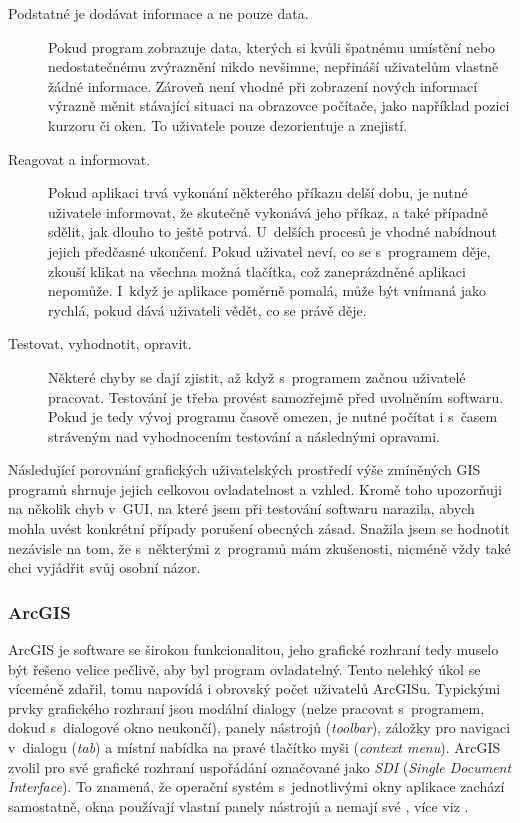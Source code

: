 \documentclass[a4paper,12pt,draft]{article}
\begin{document}
\begin{description}
\item [Podstatné je dodávat informace a ne pouze data.] Pokud program
zobrazuje data, kterých si kvůli špatnému umístění nebo nedostatečnému
zvýraznění nikdo nevšimne, nepřináší uživatelům vlastně žádné
informace. Zároveň není vhodné při zobrazení nových informací výrazně
měnit stávající situaci na obrazovce počítače, jako například pozici
kurzoru či oken. To uživatele pouze dezorientuje a znejistí.

\item [Reagovat a informovat.] Pokud aplikaci trvá vykonání některého příkazu
delší dobu, je nutné uživatele informovat, že skutečně vykonává
jeho příkaz, a také případně sdělit, jak dlouho to ještě potrvá.
U~delších procesů je vhodné nabídnout jejich předčasné ukončení. Pokud
uživatel neví, co se s~programem děje, zkouší klikat na všechna možná
tlačítka, což zaneprázdněné aplikaci nepomůže. I~když je aplikace
poměrně pomalá, může být vnímaná jako rychlá, pokud dává uživateli
vědět, co se právě děje.

\item [Testovat, vyhodnotit, opravit.] Některé chyby se dají zjistit,
až když s~programem začnou uživatelé pracovat. Testování je třeba
provést samozřejmě před uvolněním softwaru. Pokud je tedy vývoj
programu časově omezen, je nutné počítat i s~časem stráveným nad
vyhodnocením testování a následnými opravami.
 \end{description}

Následující porovnání grafických uživatelských prostředí
výše zmíněných GIS programů shrnuje jejich celkovou ovladatelnost a
vzhled. Kromě toho upozorňuji na několik chyb v~GUI, na které jsem při
testování softwaru narazila, abych mohla uvést konkrétní případy
porušení obecných zásad. Snažila jsem se hodnotit nezávisle na tom,
že s~některými z~programů mám zkušenosti, nicméně vždy také chci
vyjádřit svůj osobní názor.

\subsubsection{ArcGIS}
ArcGIS je software se širokou funkcionalitou, jeho grafické rozhraní tedy
muselo být řešeno velice pečlivě, aby byl program ovladatelný. Tento
nelehký úkol se víceméně zdařil, tomu napovídá i obrovský počet
uživatelů ArcGISu. Typickými prvky grafického rozhraní jsou modální
dialogy (nelze pracovat s~programem, dokud s~dialogové okno neukončí),
panely nástrojů (\emph{toolbar}), záložky pro navigaci v~dialogu (\emph{tab}) a
místní
nabídka na pravé tlačítko myši (\emph{context menu}). ArcGIS zvolil pro své 
grafické rozhraní uspořádání označované jako \emph{SDI} (\emph{Single Document
Interface}). To znamená, že operační systém s~jednotlivými okny aplikace
zachází samostatně, okna používají vlastní panely nástrojů a nemají
své , více viz \cite{wiki_SDI}.
\end{document}
